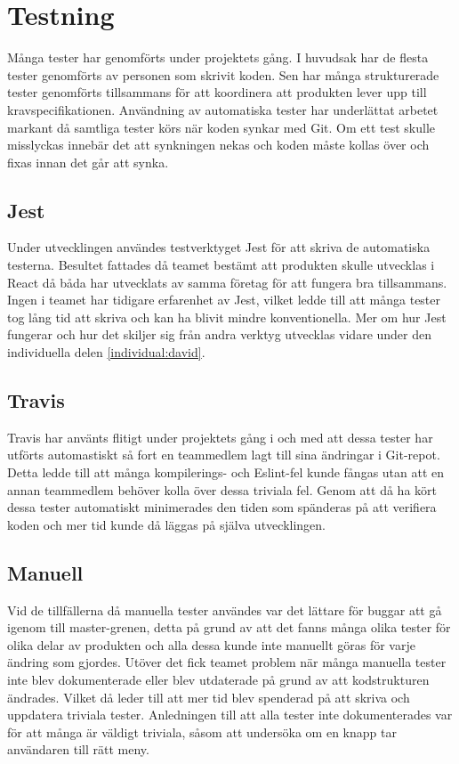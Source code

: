 \section{Testning}
Många tester har genomförts under projektets gång. I huvudsak har de flesta tester genomförts av personen som skrivit koden. Sen har många strukturerade tester genomförts tillsammans för att koordinera att produkten lever upp till kravspecifikationen. Användning av automatiska tester har underlättat arbetet markant då samtliga tester körs när koden synkar med Git. Om ett test skulle misslyckas innebär det att synkningen nekas och koden måste kollas över och fixas innan det går att synka.

\subsection{Jest}
Under utvecklingen användes testverktyget Jest för att skriva de automatiska testerna. Besultet fattades då teamet bestämt att produkten skulle utvecklas i React då båda har utvecklats av samma företag för att fungera bra tillsammans. Ingen i teamet har tidigare erfarenhet av Jest, vilket ledde till att många tester tog lång tid att skriva och kan ha blivit mindre konventionella. Mer om hur Jest fungerar och hur det skiljer sig från andra verktyg utvecklas vidare under den individuella delen \ref{individual:david}.

\subsection{Travis}
Travis har använts flitigt under projektets gång i och med att dessa tester har utförts automastiskt så fort en teammedlem lagt till sina ändringar i Git-repot. Detta ledde till att många kompilerings- och Eslint-fel kunde fångas utan att en annan teammedlem behöver kolla över dessa triviala fel. Genom att då ha kört dessa tester automatiskt minimerades den tiden som spänderas på att verifiera koden och mer tid kunde då läggas på själva utvecklingen. 

\subsection{Manuell}
Vid de tillfällerna då manuella tester användes var det lättare för buggar att gå igenom till master-grenen, detta på grund av att det fanns många olika tester för olika delar av produkten och alla dessa kunde inte manuellt göras för varje ändring som gjordes. Utöver det fick teamet problem när många manuella tester inte blev dokumenterade eller blev utdaterade på grund av att kodstrukturen ändrades. Vilket då leder till att mer tid blev spenderad på att skriva och uppdatera triviala tester. Anledningen till att alla tester inte dokumenterades var för att många är väldigt triviala, såsom att undersöka om en knapp tar användaren till rätt meny. 
